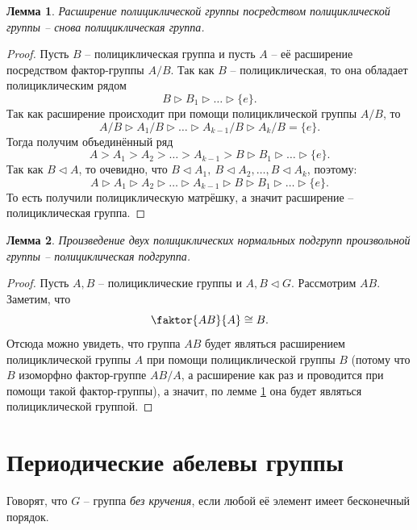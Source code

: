 \documentclass{article}
\newtheorem{lemma}{Лемма}[section]
\begin{document}
\begin{lemma} \label{eftiq}
    Расширение полициклической группы посредством полициклической группы -- снова полициклическая группа.
\end{lemma}
\begin{proof}
    Пусть $B$ -- полициклическая группа и пусть $A$ -- её расширение посредством фактор-группы $A / B$. Так как $B$ -- полициклическая, то она обладает полициклическим рядом $$ B \triangleright B_1 \triangleright \ldots \triangleright \{ e \}. $$
    Так как расширение происходит при помощи полициклической группы $A / B$, то $$ A / B \triangleright A_1 / B \triangleright \ldots \triangleright A_{k - 1} / B \triangleright A_k / B = \{ e \}. $$
    Тогда получим объединённый ряд $$ A > A_1 > A_2 > \ldots > A_{k - 1} > B \triangleright B_1 \triangleright \ldots \triangleright \{ e \}. $$
    Так как $B \triangleleft A$, то очевидно, что $B \triangleleft A_1, \ B \triangleleft A_2, \ldots, B \triangleleft A_k$, поэтому:
    $$ A \triangleright A_1 \triangleright A_2 \triangleright \ldots \triangleright A_{k - 1} \triangleright B \triangleright B_1 \triangleright \ldots \triangleright \{ e \}. $$ То есть получили полициклическую матрёшку, а значит расширение -- полициклическая группа.
\end{proof}

\begin{lemma}
    Произведение двух полициклических нормальных подгрупп произвольной группы -- полициклическая подгруппа.
\end{lemma}
\begin{proof}
    Пусть $A, B$ -- полициклические группы и $A, B \triangleleft G$. Рассмотрим $AB$. Заметим, что $$ \faktor{AB}{A} \cong B. $$
    Отсюда можно увидеть, что группа $AB$ будет являться расширением полициклической группы $A$ при помощи полициклической группы $B$ (потому что $B$ изоморфно фактор-группе $AB / A$, а расширение как раз и проводится при помощи такой фактор-группы), а значит, по лемме \ref{eftiq} она будет являться полициклической группой.
\end{proof}

\newpage

\section{Периодические абелевы группы}

Говорят, что $G$ -- группа \textit{без кручения}, если любой её элемент имеет бесконечный порядок.
\end{document}
